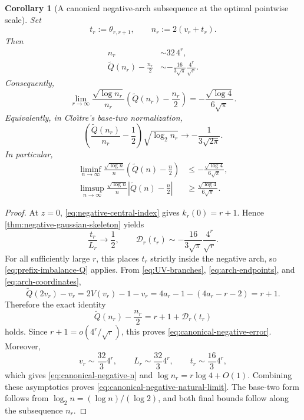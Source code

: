 \documentclass[11pt]{article}
\newtheorem{corollary}[theorem]{Corollary}
\theoremstyle{definition}
\theoremstyle{remark}
\newcommand{\Qp}{\widetilde Q}
\begin{document}
\begin{corollary}[A canonical negative-arch subsequence at the optimal pointwise scale]
\label{cor:canonical-negative-subsequence}
Set
\[
 t_r:=\theta_{r,r+1},
 \qquad
 n_r:=2(v_r+t_r).
\]
Then
\begin{align}
 n_r&\sim32\,4^r,
 \label{eq:canonical-negative-n}\\
 \Qp(n_r)-\frac{n_r}{2}
 &\sim-\frac{16}{3\sqrt\pi}\frac{4^r}{\sqrt r}.
 \label{eq:canonical-negative-error}
\end{align}
Consequently,
\begin{equation}
 \boxed{\displaystyle
 \lim_{r\to\infty}
 \frac{\sqrt{\log n_r}}{n_r}
 \left(\Qp(n_r)-\frac{n_r}{2}\right)
 =-\frac{\sqrt{\log4}}{6\sqrt\pi}.}
 \label{eq:canonical-negative-natural-limit}
\end{equation}
Equivalently, in Clo\^{\i}tre's base-two normalization,
\begin{equation}
 \left(\frac{\Qp(n_r)}{n_r}-\frac12\right)
 \sqrt{\log_2n_r}
 \longrightarrow-\frac{1}{3\sqrt{2\pi}}.
 \label{eq:canonical-negative-base-two-limit}
\end{equation}
In particular,
\begin{align*}
 \liminf_{n\to\infty}
 \frac{\sqrt{\log n}}{n}
 \left(\Qp(n)-\frac n2\right)
 &\le-\frac{\sqrt{\log4}}{6\sqrt\pi},\\
 \limsup_{n\to\infty}
 \frac{\sqrt{\log n}}{n}
 \left|\Qp(n)-\frac n2\right|
 &\ge\frac{\sqrt{\log4}}{6\sqrt\pi}.
\end{align*}
\end{corollary}

\begin{proof}
At \(z=0\), \eqref{eq:negative-central-index} gives
\(k_r(0)=r+1\).  Hence
\cref{thm:negative-gaussian-skeleton} yields
\[
 \frac{t_r}{L_r}\longrightarrow\frac12,
 \qquad
 \mathscr D_r(t_r)
 \sim-\frac{16}{3\sqrt\pi}\frac{4^r}{\sqrt r}.
\]
For all sufficiently large \(r\), this places \(t_r\) strictly inside the
negative arch, so \eqref{eq:prefix-imbalance-Q} applies.  From
\eqref{eq:UV-branches}, \eqref{eq:arch-endpoints}, and
\eqref{eq:arch-coordinates},
\[
 \Qp(2v_r)-v_r
 =2V(v_r)-1-v_r
 =4a_r-1-(4a_r-r-2)=r+1.
\]
Therefore the exact identity
\[
 \Qp(n_r)-\frac{n_r}{2}
 =r+1+\mathscr D_r(t_r)
\]
holds.  Since \(r+1=o(4^r/\sqrt r)\), this proves
\eqref{eq:canonical-negative-error}.  Moreover,
\[
 v_r\sim\frac{32}{3}4^r,
 \qquad
 L_r\sim\frac{32}{3}4^r,
 \qquad
 t_r\sim\frac{16}{3}4^r,
\]
which gives \eqref{eq:canonical-negative-n} and
\(\log n_r=r\log4+O(1)\).  Combining these asymptotics proves
\eqref{eq:canonical-negative-natural-limit}.  The base-two form follows
from \(\log_2n=(\log n)/(\log2)\), and both final bounds follow along the
subsequence \(n_r\).
\end{proof}
\end{document}
